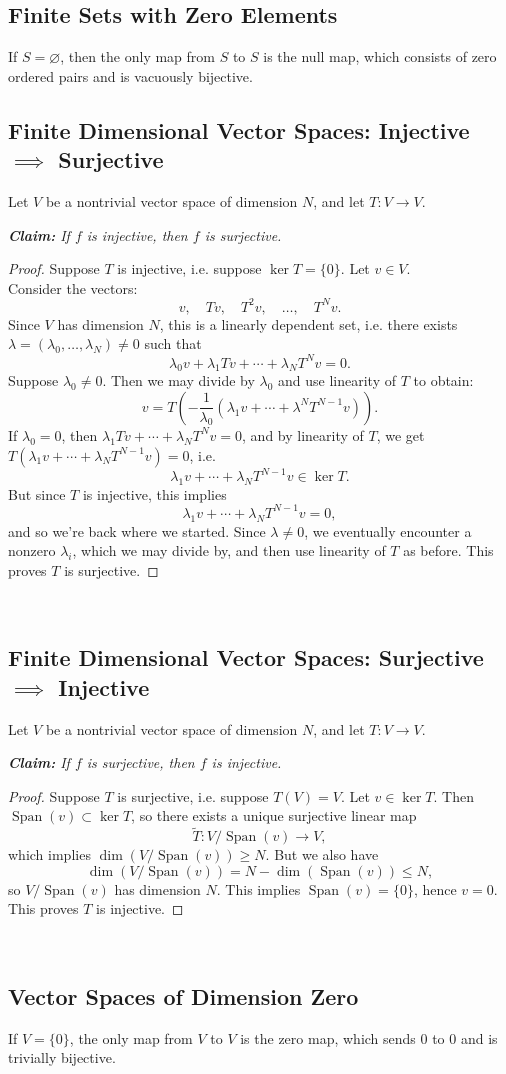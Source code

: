 \documentclass[12pt]{memoir}
\def\br{~\\[1em]}
\DeclareMathOperator{\Span}{Span}
\begin{document}
\subsection*{Finite Sets with Zero Elements}
If $S = \varnothing$, then the only map from $S$ to $S$ is the null map,
which consists of zero ordered pairs and is vacuously bijective.
\vfill\pagebreak
\subsection*{Finite Dimensional Vector Spaces:
\quad Injective $\implies$ Surjective}
Let $V$ be a nontrivial vector space of dimension $N$,
and let $T:V\to V$.
\begin{center}
\textit{\textbf{Claim:} If $f$ is injective, then $f$ is surjective.}
\end{center}
\begin{proof}
Suppose $T$ is injective, i.e. suppose $\ker T = \{0\}$. Let $v\in V$.
\br
Consider the vectors:
\[v,\quad Tv,\quad T^2v,\quad\dots,\quad T^Nv.\]
Since $V$ has dimension $N$, this is a linearly dependent set,
i.e. there exists $\lambda = (\lambda_0,\dots,\lambda_N)\ne 0$
such that
\[\lambda_0v + \lambda_1Tv + \cdots + \lambda_NT^Nv = 0.\]
Suppose $\lambda_0\ne 0$. Then we may divide by $\lambda_0$
and use linearity of $T$ to obtain:
\[v = T\left(-\frac{1}{\lambda_0}
(\lambda_1v + \cdots + \lambda^NT^{N-1}v)\right).\]
If $\lambda_0 = 0$, then $\lambda_1Tv + \cdots + \lambda_NT^Nv = 0$,
and by linearity of $T$, we get
$T(\lambda_1v + \cdots + \lambda_NT^{N-1}v) = 0$, i.e.
\[\lambda_1v + \cdots + \lambda_NT^{N-1}v\in\ker T.\]
But since $T$ is injective, this implies
\[\lambda_1v + \cdots + \lambda_NT^{N-1}v = 0,\]
and so we're back where we started. Since $\lambda\ne 0$,
we eventually encounter a nonzero $\lambda_i$, which we may divide by,
and then use linearity of $T$ as before.
This proves $T$ is surjective.
\end{proof}
~\\[-2em]
\subsection*{Finite Dimensional Vector Spaces:\quad
Surjective $\implies$ Injective}
Let $V$ be a nontrivial vector space of dimension $N$,
and let $T:V\to V$.
\begin{center}
\textit{\textbf{Claim:} If $f$ is surjective, then $f$ is injective.}
\end{center}
\begin{proof}
Suppose $T$ is surjective, i.e. suppose $T(V) = V$.
Let $v\in\ker T$. Then $\Span(v)\subset\ker T$, so there
exists a unique surjective linear map
\[\widetilde T:V/\Span(v)\to V,\]
which implies $\dim(V/\Span(v))\ge N$. But we also have
\[\dim(V/\Span(v)) = N - \dim(\Span(v))\le N,\]
so $V/\Span(v)$ has dimension $N$.
This implies $\Span(v) = \{0\}$, hence $v = 0$.
This proves $T$ is injective.
\end{proof}
~\\[-2em]
\subsection*{Vector Spaces of Dimension Zero}
If $V = \{0\}$, the only map from $V$ to $V$ is the zero map, which
sends 0 to 0 and is trivially bijective.
\end{document}
